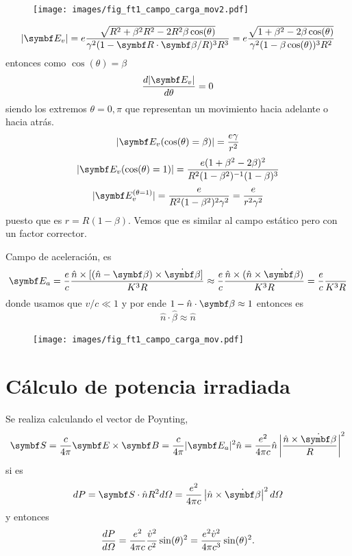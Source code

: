 \documentclass[10pt,oneside]{CBFT_book}
\begin{document}
\begin{figure}[htb]
	\begin{center}
	\texttt{[image: images/fig\_ft1\_campo\_carga\_mov2.pdf]}	 
	\end{center}
	\caption{}
\end{figure} 

\[
	|\vb{E}_v| = e\frac{\sqrt{ R^2 + \beta^2 R^2 - 2R^2 \beta \cos(\theta)}}
		{\gamma^2( 1 - \vb{R}\cdot\vb{\beta}/R)^3 R^3} =
		e\frac{\sqrt{ 1 + \beta^2 - 2 \beta \cos(\theta)}}
		{\gamma^2( 1 - \beta \cos(\theta))^3 R^2}
\]
entonces como $\cos(\theta) = \beta$
\[
	\dtot{ |\vb{E}_v| }{\theta}= 0
\]
siendo los extremos $\theta=0,\pi$ que representan un movimiento hacia adelante o hacia atrás.
\[
	|\vb{E}_v(\cos(\theta) = \beta)| = \frac{e\gamma}{r^2}
\]
\[
	|\vb{E}_v(\cos(\theta) = 1)| = \frac{e (1+\beta^2-2\beta)^2}{R^2(1-\beta^2)^{-1}(1-\beta)^3}
\]
\[
	|\vb{E}_v^{(\theta = 1)}| = \frac{e }{R^2(1-\beta^2)^2 \gamma^2} = \frac{e}{r^2 \gamma^2}
\]
puesto que es $r=R(1-\beta)$. Vemos que es similar al campo estático pero con un factor corrector.

Campo de aceleración, es
\[
	\vb{E}_a = \frac{e}{c} \frac{ \hat{n} \times [ (\hat{n}-\vb{\beta})\times \dot{\vb{\beta}} ]}{K^3 R} 
		\approx \frac{e}{c} \frac{ \hat{n} \times ( \hat{n} \times \dot{\vb{\beta}})}{K^3 R} 
		= \frac{e}{c} \frac{}{K^3 R}
\]
donde usamos que $v/c \ll 1$ y por ende $ 1 - \hat{n}\cdot\vb{\beta}\approx 1$ entonces es 
\[
	\hat{n} \cdot \hat{\beta} \approx \hat{n}
\]

\begin{figure}[htb]
	\begin{center}
	\texttt{[image: images/fig\_ft1\_campo\_carga\_mov.pdf]}	 
	\end{center}
	\caption{}
\end{figure}

\section{Cálculo de potencia irradiada}

Se realiza calculando el vector de Poynting,
\[
	\vb{S} = \frac{c}{4\pi} \pv{E}{B} = \frac{c}{4\pi} |\vb{E}_a|^2 \hat{n} =  \frac{e^2}{4\pi c}
		\hat{n} \left| \frac{\hat{n} \times \dot{\vb{\beta}} }{R} \right|^2
\]
si es 
\[
	dP = \vb{S}\cdot\hat{n} R^2 d\Omega =
		\frac{e^2}{4\pi c} \left| \hat{n} \times \dot{\vb{\beta}} \right|^2 d\Omega
\]
y entonces 
\[
	\frac{d^{\hspace{-0.05em}} {P}}{d {\Omega}^{\hspace{-0.05em}}} = \frac{e^2}{4\pi c} \frac{\dot{v}^2}{c^2} \sin(\theta)^2 = 
		\frac{e^2 \dot{v}^2 }{4\pi c^3} \sin(\theta)^2.
\]
\end{document}
